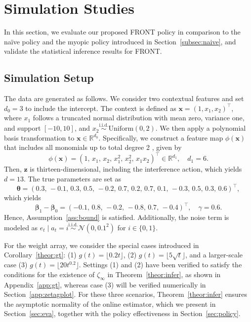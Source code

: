 \documentclass[12pt]{article}
\begin{document}
\section{Simulation Studies}
\label{sec:simulation}

In this section, we evaluate our proposed FRONT policy in comparison to the na\"ive policy and the myopic policy introduced in Section~\ref{subsec:naive}, and validate the statistical inference results for FRONT. 


\subsection{Simulation Setup} 

The data are generated as follows. We consider two contextual features and set $d_0 = 3$ to include the intercept. The context is defined as $\bm{x} = (1, x_1, x_2)^{\top}$, where $x_1$ follows a truncated normal distribution with mean zero, variance one, and support $[-10, 10]$, and $x_2 \stackrel{\text{i.i.d.}}{\sim} \text{Uniform}(0, 2)$. 
We then apply a polynomial basis transformation to $\bm{x} \in \mathbb{R}^{d_0}$. 
Specifically, we construct a feature map $\phi(\bm{x})$ that includes all monomials up to total degree 2 \citep{dubey2022scalable}, given by
\[
\phi(\bm{x}) = \left(1, \, x_1, \, x_2, \, x_1^2, \, x_2^2, \, x_1 x_2 \right)^\top 
\in \mathbb{R}^{d_1}, \quad d_1 = 6.
\]
Then, $\bm{z}$ is thirteen-dimensional, including the interference action, which yields $d = 13$. 
The true parameters are set as 
\[
\bm{\theta} = (0.3,\,-0.1,\,0.3,\,0.5,\,-0.2,\,0.7,\,0.2,\,0.7,\,0.1,\,-0.3,\,0.5,\,0.3,\,0.6)^{\top}, 
\]
which yields
\[
\bm{\beta}_1 - \bm{\beta}_0 = (-0.1,\,0.8,\,-0.2,\,-0.8,\,0.7,\,-0.4)^{\top}, 
\quad \gamma = 0.6.
\]
Hence, Assumption~\ref{ass:bound} is satisfied. 
Additionally, the noise term is modeled as $e_t \mid a_t = i \stackrel{\text{i.i.d.}}{\sim} \mathcal{N}(0, 0.1^2)$ for $i \in \{0,1\}$.

For the weight array, we consider the special cases introduced in Corollary~\ref{theor:gt}:  
(1) $g(t) = \lfloor 0.2t \rfloor$,  
(2) $g(t) = \lfloor 5\sqrt{t} \rfloor$,  
and a larger-scale case  
(3) $g(t) = \lfloor 20t^{0.2} \rfloor$.  
Settings (1) and (2) have been verified to satisfy the conditions for the existence of $\zeta_\infty$ in Theorem~\ref{theor:infer}, as shown in Appendix~\ref{app:gt}, whereas case (3) will be verified numerically in Section~\ref{app:zetagplot}.  
For these three scenarios, Theorem~\ref{theor:infer} ensures the asymptotic normality of the online estimator, which we present in Section~\ref{sec:eva}, together with the policy effectiveness in Section~\ref{sec:policy}.  
\end{document}
